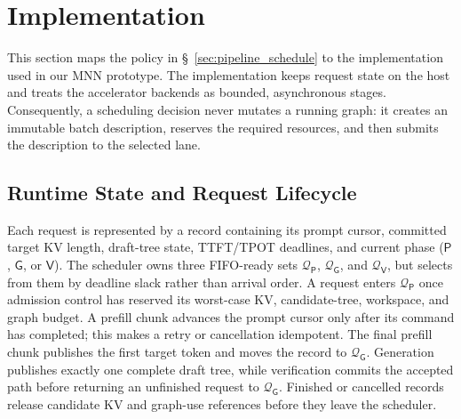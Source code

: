 \documentclass[sigconf,nonacm,10pt]{acmart}
\newcommand{\name}{NPUzzle\xspace}
\begin{document}
{{%


\section{Implementation}
This section maps the policy in \S~\ref{sec:pipeline_schedule} to the
implementation used in our MNN prototype.  The implementation keeps request
state on the host and treats the accelerator backends as bounded, asynchronous
stages.  Consequently, a scheduling decision never mutates a running graph:
it creates an immutable batch description, reserves the required resources,
and then submits the description to the selected lane.

\subsection{Runtime State and Request Lifecycle}
Each request is represented by a record containing its prompt cursor, committed
target KV length, draft-tree state, TTFT/TPOT deadlines, and current phase
($\mathsf P$, $\mathsf G$, or $\mathsf V$).  The scheduler owns three FIFO-ready
sets $\mathcal Q_{\mathsf P}$, $\mathcal Q_{\mathsf G}$, and
$\mathcal Q_{\mathsf V}$, but selects from them by deadline slack rather than
arrival order.  A request enters $\mathcal Q_{\mathsf P}$ once admission
control has reserved its worst-case KV, candidate-tree, workspace, and graph
budget.  A prefill chunk advances the prompt cursor only after its command has
completed; this makes a retry or cancellation idempotent.  The final prefill
chunk publishes the first target token and moves the record to
$\mathcal Q_{\mathsf G}$.  Generation publishes exactly one complete draft
tree, while verification commits the accepted path before returning an
unfinished request to $\mathcal Q_{\mathsf G}$.  Finished or cancelled records
release candidate KV and graph-use references before they leave the scheduler.

}}
\end{document}

